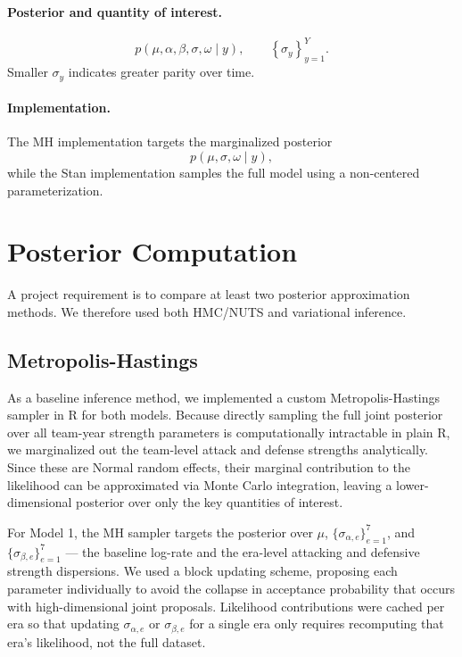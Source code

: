 \documentclass[11pt]{article}
\begin{document}
\paragraph{Posterior and quantity of interest.}
\[
p\!\left(\mu,\alpha,\beta,\sigma,\omega \mid y\right),
\qquad
\left\{\sigma_y\right\}_{y=1}^Y.
\]
Smaller \(\sigma_y\) indicates greater parity over time.

\paragraph{Implementation.}
The MH implementation targets the marginalized posterior
\[
p\!\left(\mu,\sigma,\omega \mid y\right),
\]
while the Stan implementation samples the full model using a non-centered parameterization.

\section{Posterior Computation}

A project requirement is to compare at least two posterior approximation methods.
We therefore used both HMC/NUTS and variational inference.

\subsection{Metropolis-Hastings}
As a baseline inference method, we implemented a custom Metropolis-Hastings sampler
in R for both models. Because directly sampling the full joint posterior over all
team-year strength parameters is computationally intractable in plain R, we
marginalized out the team-level attack and defense strengths analytically.
Since these are Normal random effects, their marginal contribution to the likelihood
can be approximated via Monte Carlo integration, leaving a lower-dimensional
posterior over only the key quantities of interest.

For Model 1, the MH sampler targets the posterior over $\mu$,
$\{\sigma_{\alpha,e}\}_{e=1}^{7}$, and $\{\sigma_{\beta,e}\}_{e=1}^{7}$ ---
the baseline log-rate and the era-level attacking and defensive strength dispersions.
We used a block updating scheme, proposing each parameter individually to avoid
the collapse in acceptance probability that occurs with high-dimensional joint proposals.
Likelihood contributions were cached per era so that updating $\sigma_{\alpha,e}$
or $\sigma_{\beta,e}$ for a single era only requires recomputing that era's likelihood,
not the full dataset.
\end{document}
